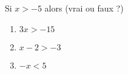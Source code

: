 
\begin{mental}
    Si \( x>-5\) alors (vrai ou faux ?)
    \begin{enumerate}
        \item
            \( 3x>-15\)
        \item
            \( x-2>-3\)
        \item
            \( -x<5\)
    \end{enumerate}
\end{mental}
